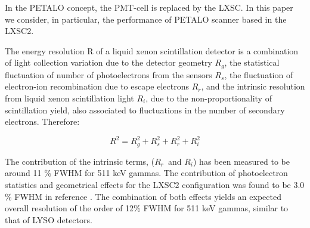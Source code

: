 \documentclass[review]{elsarticle}
\begin{document}
In the PETALO concept, the PMT-cell is replaced by the LXSC. In this paper we consider, in particular, the performance of PETALO scanner based in the LXSC2.

The energy resolution R of a liquid xenon scintillation detector is a combination of light collection variation due to the detector geometry $R_g$, the statistical fluctuation of number of photoelectrons from the sensors $R_s$, the fluctuation of electron-ion recombination due to escape electrons $R_r$, and the intrinsic resolution from liquid xenon scintillation light $R_i$, due to the non-proportionality of scintillation yield, also associated to fluctuations in the number of secondary electrons. Therefore:

\begin{equation}
R^2 = R_g^2 + R_s^2 + R_r^2 + R_i^2
\end{equation}

The contribution of the intrinsic terms, ($R_r$~and $R_i$) has been measured to be
around 11 \% FWHM \cite{aprileRes} for 511 keV gammas. The contribution of photoelectron statistics and geometrical effects for the LXSC2 configuration was found to be 3.0 \% FWHM
in reference \cite{Petalo2015}. The combination of both effects yields an expected 
overall resolution of the order of 12\% FWHM for 511 keV gammas, similar to that of LYSO detectors. 
\end{document}
